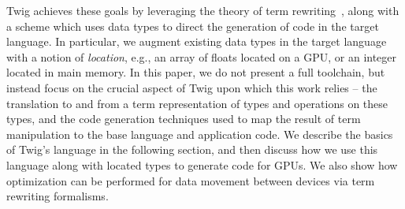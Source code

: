 Twig achieves these goals by leveraging the theory of term
rewriting~\cite{baader98rewriting}, along with a scheme which uses data types to
direct the generation of code in the target language. In particular, we augment
existing data types in the target language with a notion of \emph{location},
e.g., an array of floats located on a GPU, or an integer located in main memory.
In this paper, we do not present a full toolchain, but instead focus on the
crucial aspect of Twig upon which this work relies -- the translation to and
from a term representation of types and operations on these types, and the code
generation techniques used to map the result of term manipulation to the base
language and application code. We describe the basics of Twig's language in the
following section, and then discuss how we use this language along with located
types to generate code for GPUs. We also show how optimization can be performed
for data movement between devices via term rewriting formalisms.


